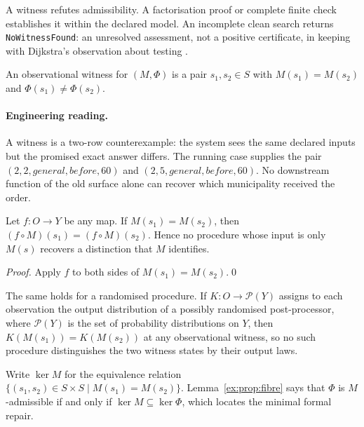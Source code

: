\documentclass[smallextended,envcountsect,envcountsame,natbib]{svjour3}
\newcommand{\code}[1]{\texttt{#1}}
\begin{document}
A witness refutes admissibility. A factorisation proof or complete finite check establishes it within the declared model. An incomplete clean search returns \code{NoWitnessFound}: an unresolved assessment, not a positive certificate, in keeping with Dijkstra's observation about testing \citep{dijkstra1970}.

\begin{definition}\label{ex:def:witness}
An observational witness for $(M,\Phi)$ is a pair $s_1,s_2 \in S$ with $M(s_1)=M(s_2)$ and $\Phi(s_1) \neq \Phi(s_2)$.
\end{definition}

\paragraph{Engineering reading.} A witness is a two-row counterexample: the system sees the same declared inputs but the promised exact answer differs. The running case supplies the pair $(2,2,\mathit{general},\mathit{before},60)$ and $(2,5,\mathit{general},\mathit{before},60)$. No downstream function of the old surface alone can recover which municipality received the order.

\begin{proposition}\label{ex:prop:norecovery}
Let $f:O\to Y$ be any map. If $M(s_1)=M(s_2)$, then $(f \circ M)(s_1)=(f \circ M)(s_2)$. Hence no procedure whose input is only $M(s)$ recovers a distinction that $M$ identifies.
\end{proposition}

\begin{proof}
Apply $f$ to both sides of $M(s_1)=M(s_2)$.\qed
\end{proof}

\begin{remark}\label{ex:cor:no-stochastic-recovery}
The same holds for a randomised procedure. If $K:O\to\mathcal{P}(Y)$ assigns to each observation the output distribution of a possibly randomised post-processor, where $\mathcal{P}(Y)$ is the set of probability distributions on $Y$, then $K(M(s_1))=K(M(s_2))$ at any observational witness, so no such procedure distinguishes the two witness states by their output laws.
\end{remark}

Write $\ker M$ for the equivalence relation $\{(s_1,s_2)\in S\times S\mid M(s_1)=M(s_2)\}$. Lemma~\ref{ex:prop:fibre} says that $\Phi$ is $M$-admissible if and only if $\ker M \subseteq \ker \Phi$, which locates the minimal formal repair.
\end{document}
